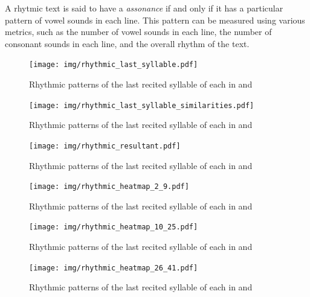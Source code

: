 \begin{defnx}[Assonance]
    A rhytmic text is said to have a \textit{assonance} if and only if it has a particular pattern of vowel sounds in each line. This pattern can be measured using various metrics, such as the number of vowel sounds in each line, the number of consonant sounds in each line, and the overall rhythm of the text. 
\end{defnx}


\begin{figure}[!h]
    \centering
    \texttt{[image: img/rhythmic\_last\_syllable.pdf]}
    \caption{Rhythmic patterns of the last recited syllable of each   in   and  }
    \label{fig:result_last_syllable_rhythmic}
\end{figure}
\begin{figure}[!h]
    \centering
    \texttt{[image: img/rhythmic\_last\_syllable\_similarities.pdf]}
    \caption{Rhythmic patterns of the last recited syllable of each   in   and  }
    \label{fig:result_last_syllable_rhythmic}
\end{figure}

\begin{figure}[!h]
    \centering
    \texttt{[image: img/rhythmic\_resultant.pdf]}
    \caption{Rhythmic patterns of the last recited syllable of each   in   and  }
    \label{fig:result_last_syllable_rhythmic}
\end{figure}

\begin{figure}[!h]
    \centering
    \texttt{[image: img/rhythmic\_heatmap\_2\_9.pdf]}
    \caption{Rhythmic patterns of the last recited syllable of each   in   and  }
    \label{fig:result_last_syllable_rhythmic}
\end{figure}
\begin{figure}[!h]
    \centering
    \texttt{[image: img/rhythmic\_heatmap\_10\_25.pdf]}
    \caption{Rhythmic patterns of the last recited syllable of each   in   and  }
    \label{fig:result_last_syllable_rhythmic}
\end{figure}
\begin{figure}[!h]
    \centering
    \texttt{[image: img/rhythmic\_heatmap\_26\_41.pdf]}
    \caption{Rhythmic patterns of the last recited syllable of each   in   and  }
    \label{fig:result_last_syllable_rhythmic}
\end{figure}
